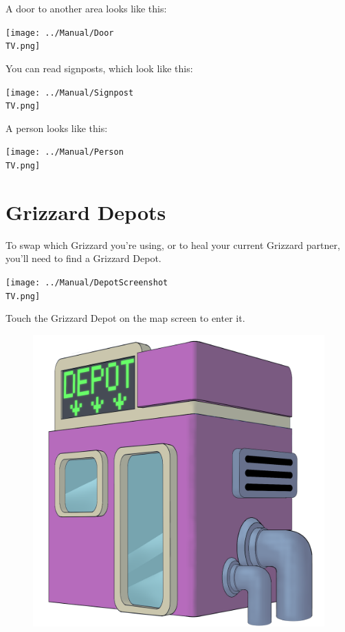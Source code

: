 \documentclass[10pt,twocolumn,openany,article]{memoir}
\newcommand\TV{NTSC}
\newcommand\TV{PAL}
\newcommand\TV{SECAM}
\begin{document}
\fi

A door to another area looks like this:

\begin{center}
  \texttt{[image: ../Manual/Door\\TV.png]}
\end{center}

You can read signposts, which look like this:

\begin{center}
  \texttt{[image: ../Manual/Signpost\\TV.png]}
\end{center}

A person looks like this:

\begin{center}
  \texttt{[image: ../Manual/Person\\TV.png]}
\end{center}

\section{Grizzard Depots}

To \ifdefined\NOSAVE\else  swap which  Grizzard you're using,  or to  \fi heal
your current Grizzard partner, you'll need to find a Grizzard Depot.

\texttt{[image: ../Manual/DepotScreenshot\\TV.png]}

Touch the Grizzard Depot on the map screen to enter it.

\begin{figure}[b]
  \begin{center}
    \includegraphics[width=2\columnwidth]{../Manual/GrizzardDepot.png}
  \end{center}
\end{figure}
\end{document}
